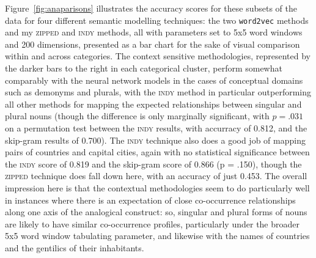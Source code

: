 \noindent Figure~\ref{fig:anaparisons} illustrates the accuracy scores for these subsets of the data for four different semantic modelling techniques: the two \texttt{word2vec} methods and my \textsc{zipped} and \textsc{indy} methods, all with parameters set to 5x5 word windows and 200 dimensions, presented as a bar chart for the sake of visual comparison within and across categories.  The context sensitive methodologies, represented by the darker bars to the right in each categorical cluster, perform somewhat comparably with the neural network models in the cases of conceptual domains such as demonyms and plurals, with the \textsc{indy} method in particular outperforming all other methods for mapping the expected relationships between singular and plural nouns (though the difference is only marginally significant, with $p = .031$ on a permutation test between the \textsc{indy} results, with accurracy of 0.812, and the skip-gram results of 0.700).  The \textsc{indy} technique also does a good job of mapping pairs of countries and capital cities, again with no statistical significance between the \textsc{indy} score of 0.819 and the skip-gram score of 0.866 (p = .150), though the \textsc{zipped} technique does fall down here, with an accuracy of just 0.453.  The overall impression here is that the contextual methodologies seem to do particularly well in instances where there is an expectation of close co-occurrence relationships along one axis of the analogical construct: so, singular and plural forms of nouns are likely to have similar co-occurrence profiles, particularly under the broader 5x5 word window tabulating parameter, and likewise with the names of countries and the gentilics of their inhabitants.

